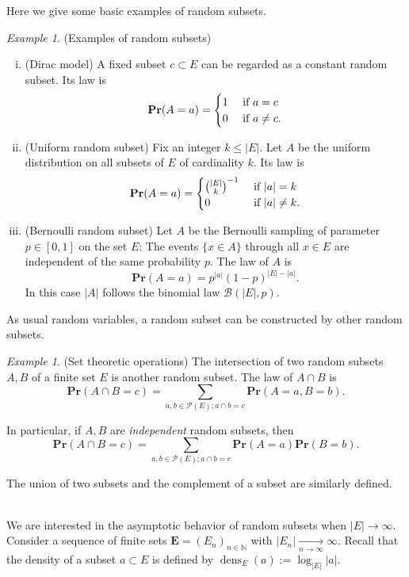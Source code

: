 \documentclass{article}
\DeclareMathOperator{\dens}{dens}
\newcommand{\moinsun}{^{-1}}
\newcommand{\bs}{\boldsymbol}
\def\Pr{\mathbf{Pr}}
\theoremstyle{remark}
\newtheorem{ex}[thm]{Example}
\begin{document}
Here we give some basic examples of random subsets.
\begin{ex}(Examples of random subsets)\label{ex random subsets}
\begin{enumerate}[(i)]
    \item (Dirac model) A fixed subset $c\subset E$ can be regarded as a constant random subset. Its law is
    \[\Pr(A=a)=\begin{cases}
        1 & \textup{ if } a = c \\
        0 & \textup{ if } a\neq c.
        \end{cases}\]

    \item (Uniform random subset) Fix an integer $k\leq |E|$. Let $A$ be the uniform distribution on all subsets of $E$ of cardinality $k$. Its law is
    \[\Pr(A=a)=\begin{cases}
        \binom{|E|}{k}\moinsun & \textup{ if } |a| = k \\
        0 & \textup{ if } |a| \neq k.
        \end{cases}\]
    \item (Bernoulli random subset) Let $A$ be the Bernoulli sampling of parameter $p\in[0,1]$ on the set $E$: The events $\{x\in A\}$ through all $x\in E$ are independent of the same probability $p$. The law of $A$ is
    \[\Pr(A=a)=p^{|a|}(1-p)^{|E|-|a|}.\]
    In this case $|A|$ follows the binomial law $\mathcal{B}(|E|,p)$.
\end{enumerate}
\end{ex}\quad

As usual random variables, a random subset can be constructed by other random subsets.
\begin{ex}(Set theoretic operations)
The intersection of two random subsets $A,B$ of a finite set $E$ is another random subset. The law of $A\cap B$ is
\[\Pr(A\cap B = c) = \sum_{a,b\in\mathcal{P}(E);a\cap b = c}\Pr(A = a , B = b).\]

In particular, if $A,B$ are \textit{independent} random subsets, then 
\[\Pr(A\cap B = c) = \sum_{a,b\in\mathcal{P}(E);a\cap b = c}\Pr(A = a)\Pr(B = b).\]

The union of two subsets and the complement of a subset are similarly defined.
\end{ex}\quad\\

We are interested in the asymptotic behavior of random subsets when $|E|\to\infty$. Consider a sequence of finite sets $\bs{E} = (E_n)_{n\in\mathbb{N}}$ with $|E_n|\xrightarrow[n\to\infty]{}\infty$. Recall that the density of a subset $a\subset E$ is defined by $\dens_E (a) := \log_{|E|}|a|$.
\end{document}
